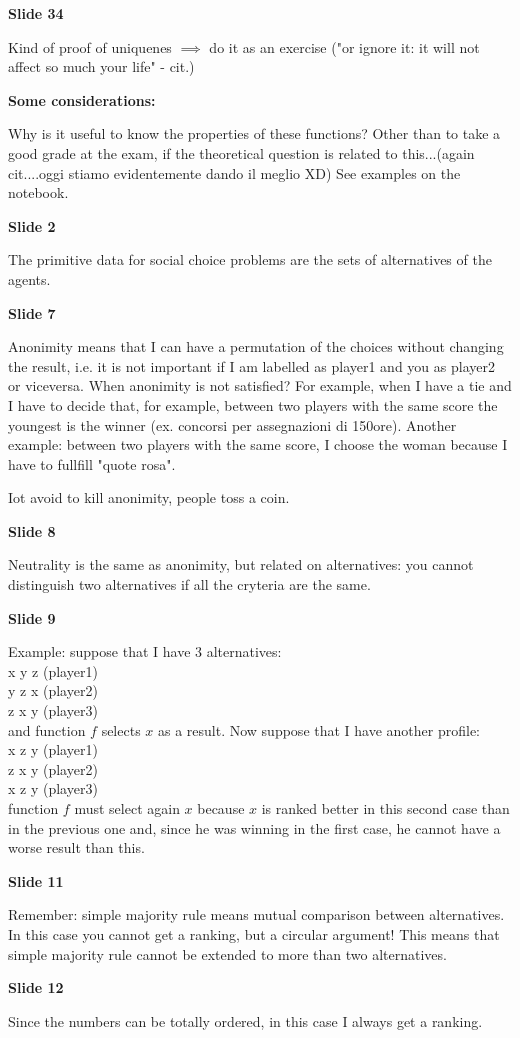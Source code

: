 \documentclass[pt11,a4paper,twoside,reqno,openright]{paper}
\begin{document}
\bigskip
\noindent \textbf{Slide 34}

\noindent Kind of proof of uniquenes $\implies$ do it as an exercise {(\huge "or 
ignore it: it will not affect so much your life" - cit.)}

\bigskip
\noindent \textbf{Some considerations:}

\noindent Why is it useful to know the properties of these functions? 
{\huge Other than to take a good grade at the exam, if the theoretical question 
is related to this...(again cit....oggi stiamo evidentemente dando il meglio 
XD)} 
See examples on the notebook.

\bigskip
{}

\bigskip
\noindent \textbf{Slide 2}

\noindent The primitive data for social choice problems are the sets of 
alternatives of the agents. 

\bigskip
\noindent \textbf{Slide 7}

\noindent Anonimity means that I can have a permutation of the choices without 
changing the result, i.e. it is not important if I am labelled as player1 and 
you as player2 or viceversa. When anonimity is not satisfied? For example, 
when I have a tie and I have to decide that, for example, between two players 
with the same score the youngest is the winner (ex. concorsi per assegnazioni di 
150ore). Another example: between two players with the same score, I choose the 
woman because I have to fullfill "quote rosa".

\noindent Iot avoid to kill anonimity, people toss a coin.

\bigskip
\noindent \textbf{Slide 8}

\noindent Neutrality is the same as anonimity, but related on alternatives: you 
cannot distinguish two alternatives if all the cryteria are the same. 

\bigskip
\noindent \textbf{Slide 9}

\noindent Example: suppose that I have 3 alternatives:\\
x 	y 	z (player1)\\
y 	z	x (player2)\\
z	x 	y (player3)\\
and function $f$ selects $x$ as a result. Now suppose that I have another 
profile:\\
x 	z 	y (player1)\\
z 	x 	y (player2)\\
x 	z 	y (player3)\\
function $f$ must select again $x$ because $x$ is ranked better in this second 
case than in the previous one and, since he was winning in the first case, he 
cannot have a worse result than this.

\bigskip
\noindent \textbf{Slide 11}

\noindent Remember: simple majority rule means mutual comparison between 
alternatives. In this case you cannot get a ranking, but a circular argument! 
This means that simple majority rule cannot be extended to more than two 
alternatives.

\bigskip
\noindent \textbf{Slide 12}

\noindent Since the numbers can be totally ordered, in this case I always get 
a ranking.
\end{document}

